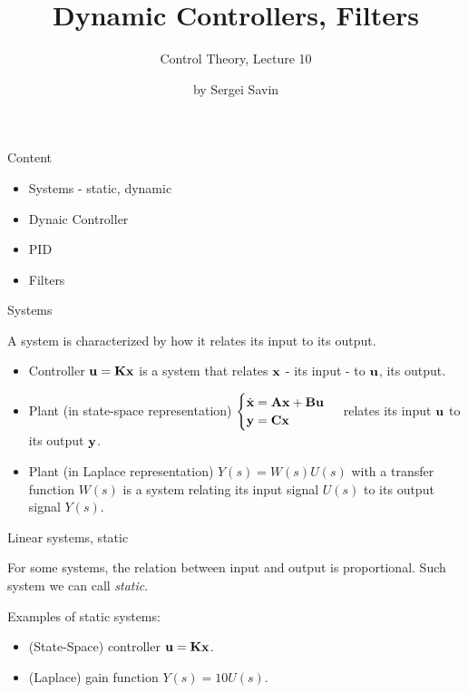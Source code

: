 \documentclass{beamer}
\title{Dynamic Controllers, Filters}
\subtitle{Control Theory, Lecture 10}
\author{by Sergei Savin}
\date{\mydate}
\begin{document}
\maketitle



\begin{frame}{Content}
\begin{itemize}
\item Systems - static, dynamic
\item Dynaic Controller
\item PID
\item Filters
\end{itemize}
\end{frame}




\begin{frame}{Systems}
\begin{flushleft}

A system is characterized by how it relates its input to its output.

\begin{itemize}
	\item Controller $\mathbf{u} = \mathbf{K}\mathbf{x}$ is a system that relates $\mathbf{x}$ - its input - to $\mathbf{u}$, its output. 
	
	\item Plant (in state-space representation) 
$\begin{cases}
		\dot {\mathbf{x}} = \mathbf{A} \mathbf{x} + \mathbf{B} \mathbf{u} \\
		\mathbf{y} = \mathbf{C} \mathbf{x}
	\end{cases}$ 
relates its input $\mathbf{u}$ to its output $\mathbf{y}$.

	\item Plant (in Laplace representation) $Y(s) = W(s)U(s)$ with a transfer function $W(s)$ is a system relating its input signal $U(s)$ to its output signal $Y(s)$.
\end{itemize}

\end{flushleft}
\end{frame}



\begin{frame}{Linear systems, static}
	\begin{flushleft}
		
		For some systems, the relation between input and output is proportional. Such system we can call \emph{static}.
		
		\bigskip
		
		Examples of static systems:
		
		\begin{itemize}
			\item (State-Space) controller $\mathbf{u} = \mathbf{K}\mathbf{x}$. 
			
			\item (Laplace) gain function $Y(s) = 10 U(s)$.
		\end{itemize}
		
	\end{flushleft}
\end{frame}
\end{document}
